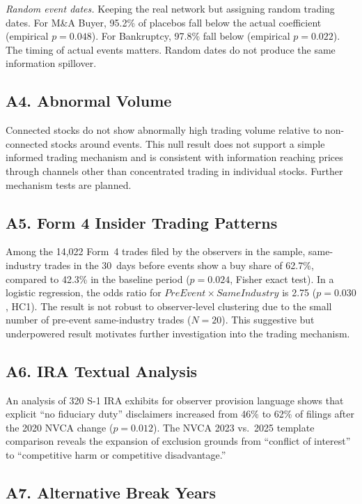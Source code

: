 \textit{Random event dates.} Keeping the real network but assigning random trading dates. For M\&A Buyer, 95.2\% of placebos fall below the actual coefficient (empirical $p=0.048$). For Bankruptcy, 97.8\% fall below (empirical $p=0.022$). The timing of actual events matters. Random dates do not produce the same information spillover.

\subsection*{A4. Abnormal Volume}

Connected stocks do not show abnormally high trading volume relative to non-connected stocks around events. This null result does not support a simple informed trading mechanism and is consistent with information reaching prices through channels other than concentrated trading in individual stocks. Further mechanism tests are planned.

\subsection*{A5. Form 4 Insider Trading Patterns}

Among the 14,022 Form~4 trades filed by the observers in the sample, same-industry trades in the 30~days before events show a buy share of 62.7\%, compared to 42.3\% in the baseline period ($p=0.024$, Fisher exact test). In a logistic regression, the odds ratio for $PreEvent \times SameIndustry$ is 2.75 ($p=0.030$, HC1). The result is not robust to observer-level clustering due to the small number of pre-event same-industry trades ($N=20$). This suggestive but underpowered result motivates further investigation into the trading mechanism.

\subsection*{A6. IRA Textual Analysis}

An analysis of 320 S-1 IRA exhibits for observer provision language shows that explicit ``no fiduciary duty'' disclaimers increased from 46\% to 62\% of filings after the 2020 NVCA change ($p=0.012$). The NVCA 2023 vs.\ 2025 template comparison reveals the expansion of exclusion grounds from ``conflict of interest'' to ``competitive harm or competitive disadvantage.''

\subsection*{A7. Alternative Break Years}

